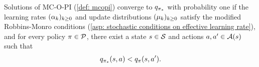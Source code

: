 
\begin{lemma}
\label{thm: lemma for no long term region}
Solutions of MC-O-PI (\autoref{def: mcopi}) converge to $q_{{\pi}_*}$ with probability one
if the learning rates $(\alpha_k)_{k \geq 0}$ and update distributions $(\mu_k)_{k \geq 0}$ satisfy the modified Robbins-Monro conditions (\autoref{asp: stochastic conditions on effective learning rate}),
and for every policy $\pi \in \mathcal{P}$,
there exist a state $s \in \mathcal{S}$ 
and actions $a, a' \in \mathcal{A}(s)$
such that
\begin{align}
\label{eq: condition of lemma almost iff}
    q_{{\pi}_*}(s, a) < q_{\pi}(s, a' ) .
\end{align}

\end{lemma}

\vspace{-0.6cm}

